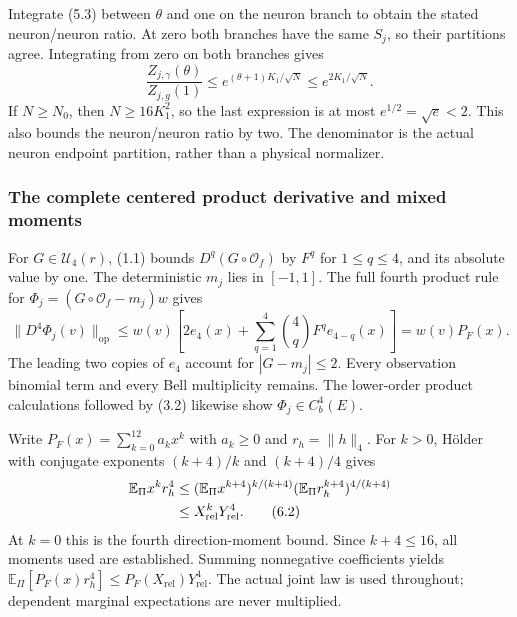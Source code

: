\documentclass[11pt]{article}
\theoremstyle{plain}
\theoremstyle{definition}
\theoremstyle{remark}
\newcommand{\E}{\mathbb{E}}
\begin{document}
Integrate (5.3) between $\theta$ and one on the neuron branch to obtain
the stated neuron/neuron ratio. At zero both branches have the same
$S_j$, so their partitions agree. Integrating from zero on both branches gives
\begin{equation}
 \frac{Z_{j,\gamma}(\theta)}{Z_{j,g}(1)}
 \le e^{(\theta+1)K_1/\sqrt N}\le e^{2K_1/\sqrt N}.\tag{5.5}
\end{equation}
If $N\ge N_0$, then $N\ge16K_1^2$, so the last expression is at most
$e^{1/2}=\sqrt e<2$. This also bounds the neuron/neuron ratio by two.
The denominator is the actual neuron endpoint partition, rather than a
physical normalizer.

\subsubsection{The complete centered product derivative and mixed moments}
For $G\in\mathcal U_4(r)$, (1.1) bounds
$D^q(G\circ\mathcal O_f)$ by $F^q$ for $1\le q\le4$, and its absolute
value by one. The deterministic $m_j$ lies in $[-1,1]$.
The full fourth product rule for $\Phi_j=(G\circ\mathcal O_f-m_j)w$ gives
\begin{equation}
 \|D^4\Phi_j(v)\|_{\mathrm{op}}
 \le w(v)\left[2e_4(x)+\sum_{q=1}^4\binom4qF^q e_{4-q}(x)\right]
 =w(v)P_F(x).\tag{6.1}
\end{equation}
The leading two copies of $e_4$ account for $|G-m_j|\le2$.
Every observation binomial term and every Bell multiplicity remains.
The lower-order product calculations followed by (3.2) likewise show
$\Phi_j\in C_b^4(E)$.

Write $P_F(x)=\sum_{k=0}^{12}a_kx^k$ with $a_k\ge0$ and
$r_h=\|h\|_4$. For $k>0$, H\"older with conjugate exponents
$(k+4)/k$ and $(k+4)/4$ gives
\begin{align}
 \E_\Pi x^kr_h^4
 &\le(\E_\Pi x^{k+4})^{k/(k+4)}
          (\E_\Pi r_h^{k+4})^{4/(k+4)}\notag\\
 &\le X_{\mathrm{rel}}^kY_{\mathrm{rel}}^4.\tag{6.2}
\end{align}
At $k=0$ this is the fourth direction-moment bound. Since $k+4\le16$,
all moments used are established. Summing nonnegative coefficients yields
$\E_\Pi[P_F(x)r_h^4]\le P_F(X_{\mathrm{rel}})Y_{\mathrm{rel}}^4$.
The actual joint law is used throughout; dependent marginal expectations
are never multiplied.

\end{document}
